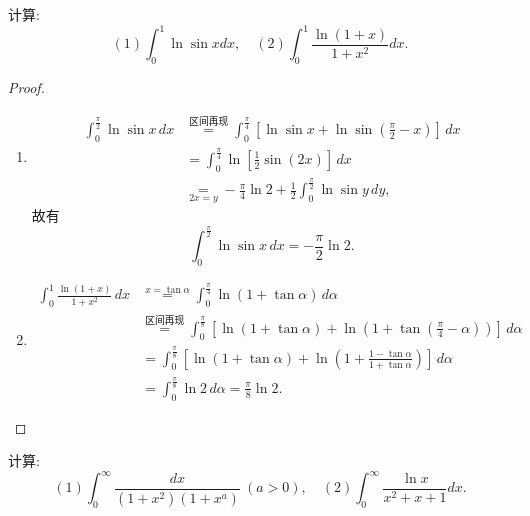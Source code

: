 \documentclass[lang=cn,10pt,thmcnt=section]{elegantbook}
\begin{document}
	\begin{example}
	计算:
	\[(1) \int_{0}^{1} \ln \sin x dx, \quad (2) \int_{0}^{1} \frac{\ln(1+x)}{1+x^2} dx.\]
	\end{example}
\begin{proof}
	\begin{enumerate}

		\item 
		\begin{align*}
			\int_{0}^{\frac{\pi}{2}} \ln\sin x \, dx 
			&\overset{\text{区间再现}}{=} \int_{0}^{\frac{\pi}{4}} \left[ \ln\sin x + \ln\sin\left(\frac{\pi}{2}-x\right) \right] \, dx \\
			&= \int_{0}^{\frac{\pi}{4}} \ln\left[\frac{1}{2}\sin(2x)\right] \, dx \\
			&\underset{2x=y}{=} -\frac{\pi}{4}\ln 2 + \frac{1}{2}\int_{0}^{\frac{\pi}{2}} \ln\sin y \, dy,
		\end{align*}
		故有
		\[
			\int_{0}^{\frac{\pi}{2}} \ln\sin x \, dx = -\frac{\pi}{2}\ln 2.
		\]
		\item 
		\begin{align*}
			\int_{0}^{1} \frac{\ln(1+x)}{1+x^2} \, dx 
			&\overset{x=\tan\alpha}{=} \int_{0}^{\frac{\pi}{4}} \ln(1+\tan\alpha) \, d\alpha \\
			&\overset{\text{区间再现}}{=} \int_{0}^{\frac{\pi}{8}} \left[ \ln(1+\tan\alpha) + \ln\left(1+\tan\left(\frac{\pi}{4}-\alpha\right)\right) \right] \, d\alpha \\
			&= \int_{0}^{\frac{\pi}{8}} \left[ \ln(1+\tan\alpha) + \ln\left(1+\frac{1-\tan\alpha}{1+\tan\alpha}\right) \right] \, d\alpha \\
			&= \int_{0}^{\frac{\pi}{8}} \ln 2 \, d\alpha = \frac{\pi}{8}\ln 2.
		\end{align*}
	
	
	\end{enumerate}
	
\end{proof}
\begin{example}
	计算:
	\[(1) \int_{0}^{\infty} \frac{dx}{(1+x^2)(1+x^a)} \ (a>0), \quad (2) \int_{0}^{\infty} \frac{\ln x}{x^2 + x + 1 }dx.\]
\end{example}
\end{document}
